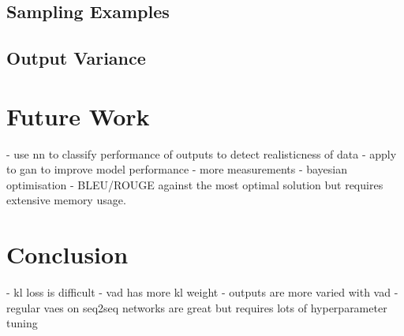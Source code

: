 \documentclass[12pt,twoside]{report}
\begin{document}
\section{Sampling Examples}


\section{Output Variance}

\chapter{Future Work}

- use nn to classify performance of outputs to detect realisticness of data
- apply to gan to improve model performance
- more measurements
- bayesian optimisation
- BLEU/ROUGE against the most optimal solution but requires extensive memory usage.

\chapter{Conclusion}

- kl loss is difficult
- vad has more kl weight
- outputs are more varied with vad
- regular vaes on seq2seq networks are great but requires lots of hyperparameter tuning



 
\end{document}
